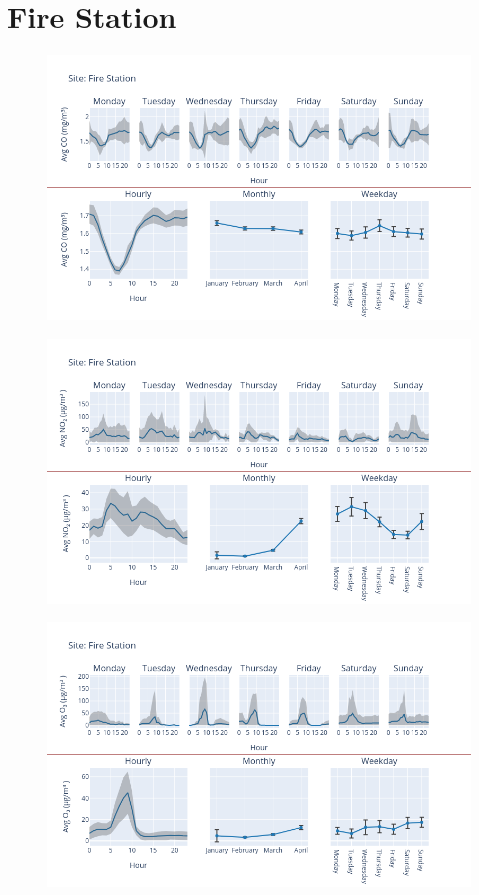 \documentclass[12pt, oneside]{book}
\begin{document}
{\section{Fire Station}
{\begin{figure}[H] 
 \centering 
\includegraphics[width=.88\textwidth, keepaspectratio]{image86} 
 \end{figure}}{} 

{\begin{figure}[H] 
 \centering 
\includegraphics[width=.88\textwidth, keepaspectratio]{image87} 
 \end{figure}}{} 

{\begin{figure}[H] 
 \centering 
\includegraphics[width=.88\textwidth, keepaspectratio]{image88} 
 \end{figure}}{} 

}
\end{document}
